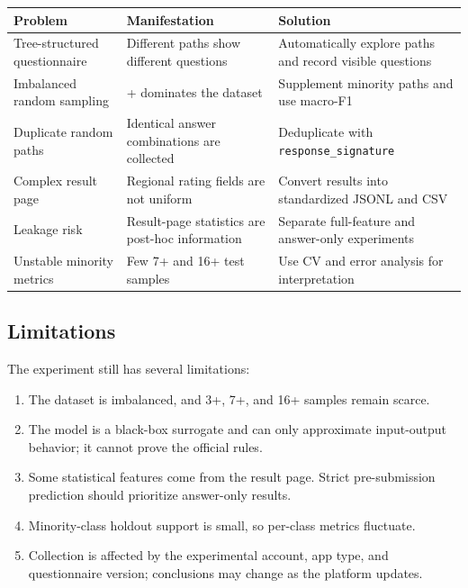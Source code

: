 \documentclass[UTF8,a4paper,12pt]{ctexart}
\newcounter{none}
\providecommand{\tightlist}{%
  \setlength{\itemsep}{0pt}\setlength{\parskip}{0pt}}
\begin{document}
{\def\LTcaptype{none} %
\begin{longtable}[]{@{}
  >{\raggedright\arraybackslash}p{}
  >{\raggedright\arraybackslash}p{}
  >{\raggedright\arraybackslash}p{}@{}}
\toprule\noalign{}
\begin{minipage}[b]{\linewidth}\raggedright
Problem
\end{minipage} & \begin{minipage}[b]{\linewidth}\raggedright
Manifestation
\end{minipage} & \begin{minipage}[b]{\linewidth}\raggedright
Solution
\end{minipage} \\
\midrule\noalign{}
\endhead
\bottomrule\noalign{}
\endlastfoot
Tree-structured questionnaire & Different paths show different questions & Automatically explore paths and record visible questions \\
Imbalanced random sampling & 18+ dominates the dataset & Supplement minority paths and use macro-F1 \\
Duplicate random paths & Identical answer combinations are collected & Deduplicate with \texttt{response\_signature} \\
Complex result page & Regional rating fields are not uniform & Convert results into standardized JSONL and CSV \\
Leakage risk & Result-page statistics are post-hoc information & Separate full-feature and answer-only experiments \\
Unstable minority metrics & Few 7+ and 16+ test samples & Use CV and error analysis for interpretation \\
\end{longtable}
}

\subsection{Limitations}\label{limitations}

The experiment still has several limitations:

\begin{enumerate}
\def\labelenumi{\arabic{enumi}.}
\tightlist
\item
  The dataset is imbalanced, and 3+, 7+, and 16+ samples remain scarce.
\item
  The model is a black-box surrogate and can only approximate input-output behavior; it cannot prove the official rules.
\item
  Some statistical features come from the result page. Strict pre-submission prediction should prioritize answer-only results.
\item
  Minority-class holdout support is small, so per-class metrics fluctuate.
\item
  Collection is affected by the experimental account, app type, and questionnaire version; conclusions may change as the platform updates.
\end{enumerate}
\end{document}
